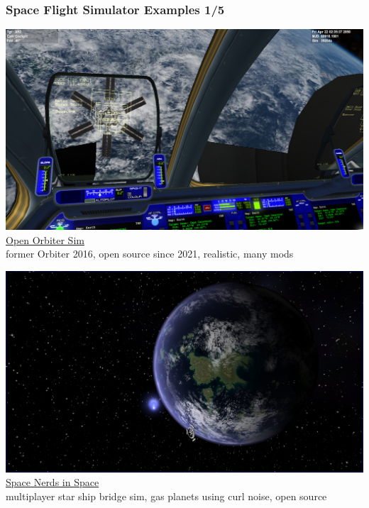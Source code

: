 \documentclass[aspectratio=169,11pt,xcolor=dvipsnames]{beamer}
\begin{document}
\begin{frame}
  \frametitle{Space Flight Simulator Examples 1/5}
  \begin{minipage}[t]{0.49\textwidth}
    \begin{center}
      \includegraphics[width=\textwidth]{orbiter}\\
      \href{https://openorbiter.space/}{Open Orbiter Sim}\\
      former Orbiter 2016, open source since 2021, realistic, many mods
    \end{center}
  \end{minipage}
  \begin{minipage}[t]{0.49\textwidth}
    \begin{center}
      \includegraphics[width=\textwidth]{nerds}\\
      \href{https://smcameron.github.io/space-nerds-in-space/}{Space Nerds in Space}\\
      multiplayer star ship bridge sim, gas planets using curl noise, open source
    \end{center}
  \end{minipage}
\end{frame}
\end{document}
